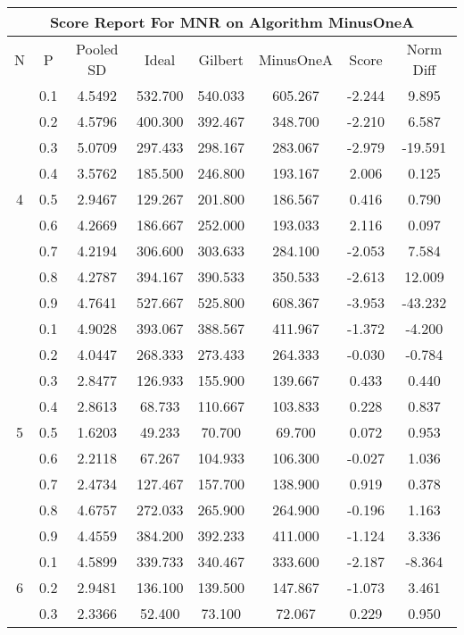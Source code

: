 \documentclass[11pt,a4paper]{report}
\begin{document}
\begin{longtable}{ | c | c || c | c | c | c | c | c | }
\hline
\multicolumn{8}{|c|}{ Score Report For MNR on Algorithm MinusOneA} \\
\hline
N & P & Pooled SD &  Ideal &  Gilbert & MinusOneA  & Score & Norm Diff \\
 \hline
 \hline
 \endhead
\multirow{9}{*}{4} & 0.1 & 4.5492 & 532.700 & 540.033 & 605.267 & -2.244 & 9.895 \\
 & 0.2 & 4.5796 & 400.300 & 392.467 & 348.700 & -2.210 & 6.587 \\
 & 0.3 & 5.0709 & 297.433 & 298.167 & 283.067 & -2.979 & -19.591 \\
 & 0.4 & 3.5762 & 185.500 & 246.800 & 193.167 & 2.006 & 0.125 \\
 & 0.5 & 2.9467 & 129.267 & 201.800 & 186.567 & 0.416 & 0.790 \\
 & 0.6 & 4.2669 & 186.667 & 252.000 & 193.033 & 2.116 & 0.097 \\
 & 0.7 & 4.2194 & 306.600 & 303.633 & 284.100 & -2.053 & 7.584 \\
 & 0.8 & 4.2787 & 394.167 & 390.533 & 350.533 & -2.613 & 12.009 \\
 & 0.9 & 4.7641 & 527.667 & 525.800 & 608.367 & -3.953 & -43.232 \\
 \hline
\multirow{9}{*}{5} & 0.1 & 4.9028 & 393.067 & 388.567 & 411.967 & -1.372 & -4.200 \\
 & 0.2 & 4.0447 & 268.333 & 273.433 & 264.333 & -0.030 & -0.784 \\
 & 0.3 & 2.8477 & 126.933 & 155.900 & 139.667 & 0.433 & 0.440 \\
 & 0.4 & 2.8613 & 68.733 & 110.667 & 103.833 & 0.228 & 0.837 \\
 & 0.5 & 1.6203 & 49.233 & 70.700 & 69.700 & 0.072 & 0.953 \\
 & 0.6 & 2.2118 & 67.267 & 104.933 & 106.300 & -0.027 & 1.036 \\
 & 0.7 & 2.4734 & 127.467 & 157.700 & 138.900 & 0.919 & 0.378 \\
 & 0.8 & 4.6757 & 272.033 & 265.900 & 264.900 & -0.196 & 1.163 \\
 & 0.9 & 4.4559 & 384.200 & 392.233 & 411.000 & -1.124 & 3.336 \\
 \hline
\multirow{9}{*}{6} & 0.1 & 4.5899 & 339.733 & 340.467 & 333.600 & -2.187 & -8.364 \\
 & 0.2 & 2.9481 & 136.100 & 139.500 & 147.867 & -1.073 & 3.461 \\
 & 0.3 & 2.3366 & 52.400 & 73.100 & 72.067 & 0.229 & 0.950 \\

\end{longtable}
\end{document}
